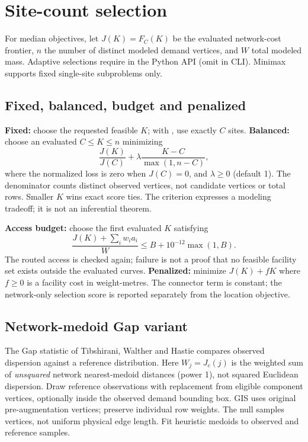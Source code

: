 \documentclass[11pt,a4paper]{article}
\newcommand{\code}[1]{\texttt{\detokenize{#1}}}
\begin{document}
\section{Site-count selection}
For median objectives, let $J(K)=F_C(K)$ be the evaluated network-cost frontier, $n$ the number of distinct modeled demand vertices, and $W$ total modeled mass. Adaptive selections require \code{k=None} in the Python API (omit \code{--k} in CLI). Minimax supports fixed single-site subproblems only.
\subsection{Fixed, balanced, budget and penalized}
\textbf{Fixed:} choose the requested feasible $K$; with \code{per_component}, use exactly $C$ sites. \textbf{Balanced:} choose an evaluated $C\le K\le n$ minimizing
\[
 \frac{J(K)}{J(C)}+\lambda\frac{K-C}{\max(1,n-C)},
\]
where the normalized loss is zero when $J(C)=0$, and $\lambda\ge0$ (default 1). The denominator counts distinct observed vertices, not candidate vertices or total rows. Smaller $K$ wins exact score ties. The criterion expresses a modeling tradeoff; it is not an inferential theorem.

\textbf{Access budget:} choose the first evaluated $K$ satisfying
\[
 \frac{J(K)+\sum_i w_i a_i}{W}\le B+10^{-12}\max(1,B).
\]
The routed access is checked again; failure is not a proof that no feasible facility set exists outside the evaluated curves. \textbf{Penalized:} minimize $J(K)+fK$ where $f\ge0$ is a facility cost in weight-metres. The connector term is constant; the network-only selection score is reported separately from the location objective.
\subsection{Network-medoid Gap variant}
The Gap statistic of Tibshirani, Walther and Hastie \cite{gap} compares observed dispersion against a reference distribution. Here $W_j=J_c(j)$ is the weighted sum of \emph{unsquared} network nearest-medoid distances (power 1), not squared Euclidean dispersion. Draw reference observations with replacement from eligible component vertices, optionally inside the observed demand bounding box. GIS uses original pre-augmentation vertices; preserve individual row weights. The null samples vertices, not uniform physical edge length. Fit heuristic medoids to observed and reference samples.
\end{document}
